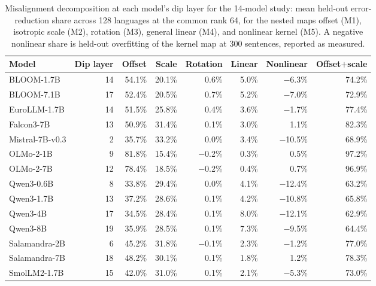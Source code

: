 \begin{table}[h]
\caption{Misalignment decomposition at each model's dip layer for the 14-model study: mean held-out error-reduction share across 128 languages at the common rank 64, for the nested maps offset (M1), isotropic scale (M2), rotation (M3), general linear (M4), and nonlinear kernel (M5). A negative nonlinear share is held-out overfitting of the kernel map at 300 sentences, reported as measured.}
\label{tab:budget_models}
\begin{center}\small
\begin{tabular}{lrrrrrrr}
\toprule
Model & Dip layer & Offset & Scale & Rotation & Linear & Nonlinear & Offset$+$scale \\
\midrule
BLOOM-1.7B & 14 & 54.1\% & 20.1\% & 0.6\% & 5.0\% & $-$6.3\% & 74.2\% \\
BLOOM-7.1B & 17 & 52.4\% & 20.5\% & 0.7\% & 5.2\% & $-$7.0\% & 72.9\% \\
EuroLLM-1.7B & 14 & 51.5\% & 25.8\% & 0.4\% & 3.6\% & $-$1.7\% & 77.4\% \\
Falcon3-7B & 13 & 50.9\% & 31.4\% & 0.1\% & 3.0\% & 1.1\% & 82.3\% \\
Mistral-7B-v0.3 & 2 & 35.7\% & 33.2\% & 0.0\% & 3.4\% & $-$10.5\% & 68.9\% \\
OLMo-2-1B & 9 & 81.8\% & 15.4\% & $-$0.2\% & 0.3\% & 0.5\% & 97.2\% \\
OLMo-2-7B & 12 & 78.4\% & 18.5\% & $-$0.2\% & 0.4\% & 0.7\% & 96.9\% \\
Qwen3-0.6B & 8 & 33.8\% & 29.4\% & 0.0\% & 4.1\% & $-$12.4\% & 63.2\% \\
Qwen3-1.7B & 13 & 37.2\% & 28.6\% & 0.1\% & 4.2\% & $-$10.8\% & 65.8\% \\
Qwen3-4B & 17 & 34.5\% & 28.4\% & 0.1\% & 8.0\% & $-$12.1\% & 62.9\% \\
Qwen3-8B & 19 & 35.9\% & 28.5\% & 0.1\% & 7.3\% & $-$9.5\% & 64.4\% \\
Salamandra-2B & 6 & 45.2\% & 31.8\% & $-$0.1\% & 2.3\% & $-$1.2\% & 77.0\% \\
Salamandra-7B & 18 & 48.2\% & 30.1\% & 0.1\% & 1.8\% & 1.2\% & 78.3\% \\
SmolLM2-1.7B & 15 & 42.0\% & 31.0\% & 0.1\% & 2.1\% & $-$5.3\% & 73.0\% \\
\bottomrule
\end{tabular}
\end{center}
\end{table}
